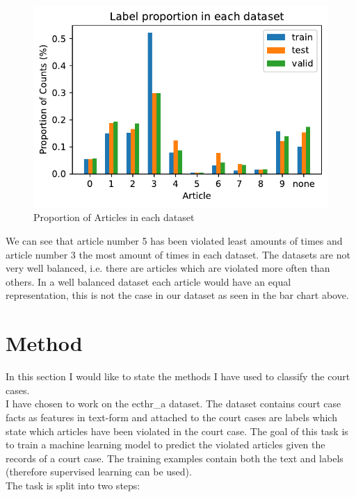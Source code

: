 \documentclass{article}
\begin{document}
\begin{figure}[H]
    \centering
    \includegraphics[]{label_proportions.pdf}
    \caption{Proportion of Articles in each dataset}
    \label{fig: label proportions}
\end{figure}

We can see that article number 5 has been violated least amounts of times and
article number 3 the most amount of times in each dataset.
The datasets are not very well balanced, i.e. there are articles which
are violated more often than others. In a well balanced dataset each
article would have an equal representation, this is not the case in our
dataset as seen in the bar chart above.

\section{Method}

In this section I would like to state the methods I have used 
to classify the court cases.\\

I have chosen to work on the ecthr\_a dataset. The dataset
contains court case facts as features in text-form and attached
to the court cases are labels which state which articles have
been violated in the court case. The goal of this task is to train
a machine learning model to predict the violated articles given the 
records of a court case. The training examples contain
both the text and labels (therefore supervised learning can be used).\\

The task is split into two steps:
\end{document}
